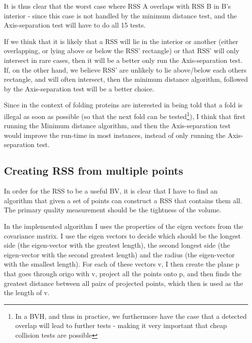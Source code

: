It is thus clear that the worst case where RSS A overlaps with RSS B in B's interior - since this case is not handled by the minimum distance test, and the Axis-separation test will have to do all 15 tests. 

If we think that it is likely that a RSS will lie in the interior or another (either overlapping, or lying above or below the RSS' rectangle) or that RSS' will only intersect in rare cases, then it will be a better only run the Axis-separation test. If, on the other hand, we believe RSS' are unlikely to lie above/below each others rectangle, and will often intersect, then the minimum distance algorithm, followed by the Axis-separation test will be a better choice.

Since in the context of folding proteins are interested in being told that a fold is illegal as soon as possible (so that the next fold can be tested\footnote{In a BVH, and thus in practice, we furthermore have the case that a detected overlap will lead to further tests - making it very important that cheap collision tests are possible}), I think that first running the Minimum distance algorithm, and then the Axis-separation test would improve the run-time in most instances, instead of only running the Axis-separation test.

\subsection{Creating RSS from multiple points}
\label{multiple-points}
In order for the RSS to be a useful BV, it is clear that I have to find an algorithm that given a set of points can construct a RSS that contains them all. The primary quality measurement should be the tightness of the volume.

In the implemented algorithm I uses the properties of the eigen vectors from the covariance matrix. 
I use the eigen vectors to decide which should be the longest side (the eigen-vector with the greatest length), the second longest side (the eigen-vector with the second greatest length) and the radius (the eigen-vector with the smallest length). For each of these vectors v, I then create the plane p that goes through origo with v, project all the points onto p, and then finds the greatest distance between all pairs of projected points, which then is used as the the length of v.

